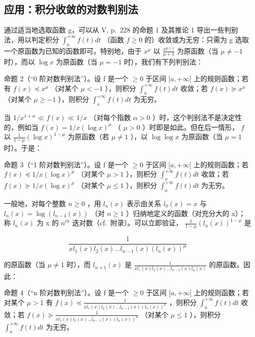\subsection{应用：积分收敛的对数判别法}

通过适当地选取函数 g，可以从 V, p.~228 的命题 1 及其推论 1 导出一些判别法，用以判定积分 \(\int_{a}^{+\infty} f(t) dt\) （函数 \(f \geqslant 0\) 的）收敛或为无穷：只需为 g 选取一个原函数为已知的函数即可。特别地，由于 \(x^{\mu}\) 以 \(\frac{x^{\mu+1}}{\mu+1}\) 为原函数（当 \(\mu \neq -1\) 时），而以 \(\log x\) 为原函数（当 \(\mu = -1\) 时），我们有下列判别法：

命题 2（``0 阶对数判别法''）。设 f 是一个 \(\geqslant 0\) 于区间 \([a, +\infty[\) 上的规则函数；若有 \(f(x) \preccurlyeq x^{\mu}\) （对某个 \(\mu < -1\) ），则积分 \(\int_{a}^{+\infty} f(t) dt\) 收敛；若 \(f(x) \succcurlyeq x^{\mu}\) （对某个 \(\mu \geqslant -1\) ），则积分 \(\int_{a}^{+\infty} f(t) dt\) 为无穷。

当 \(1 / x^{1 + \alpha} \ll f(x) \ll 1 / x\) （对每个指数 \(\alpha > 0\) ）时，这个判别法不是决定性的，例如当 \(f(x) = 1 / x(\log x)^{\mu}\) （ \(\mu > 0\) ）时即是如此。但在后一情形， \(f\) 以 \(\frac{1}{1 - \mu} (\log x)^{1 - \mu}\) 为原函数（若 \(\mu \neq 1\) ），以 \(\log \log x\) 为原函数（当 \(\mu = 1\) 时）。于是：

命题 3（``1 阶对数判别法''）。设 f 是一个 \(\geqslant 0\) 于区间 \([a, +\infty[\) 上的规则函数；若 \(f(x) \preccurlyeq 1/x(\log x)^{\mu}\) （对某个 \(\mu > 1\) ），则积分 \(\int_{a}^{+\infty} f(t) dt\) 收敛；若 \(f(x) \succcurlyeq 1/x(\log x)^{\mu}\) （对某个 \(\mu \leqslant 1\) ），则积分 \(\int_{a}^{+\infty} f(t) dt\) 为无穷。

一般地，对每个整数 \(n \geqslant 0\) ，用 \(l_{n}(x)\) 表示由关系 \(l_{0}(x) = x\) 与 \(l_{n}(x) = \log(l_{n-1}(x))\) （对 \(n \geqslant 1\) ）归纳地定义的函数（对充分大的 x）；称 \(l_{n}(x)\) 为 x 的 \(n^{th}\) 迭对数（cf.~附录）。可以立即验证， \(\frac{1}{1 - \mu}\left(l_{n}(x)\right)^{1 - \mu}\) 是

\[
\frac {1}{x l _ {1} (x) l _ {2} (x) \dots l _ {n - 1} (x) \left(l _ {n} (x)\right) ^ {\mu}}
\]

的原函数（当 \(\mu \neq 1\) 时），而 \(l_{n+1}(x)\) 是 \(\frac{1}{xl_1(x)l_2(x)\ldots l_{n-1}(x)l_n(x)}\) 的原函数。因此：

命题 4（``n 阶对数判别法''）。设 f 是一个 \(\geqslant0\) 于区间 \([a,+\infty[\) 上的规则函数；若对某个 \(\mu>1\) 有 \(f(x)\preccurlyeq\frac{1}{xl_{1}(x)l_{2}(x)\ldots l_{n-1}(x)(l_{n}(x))^{\mu}}\) ，则积分 \(\int_{a}^{+\infty}f(t)dt\) 收敛；若 \(f(x)\succcurlyeq\frac{1}{xl_{1}(x)l_{2}(x)\ldots l_{n-1}(x)(l_{n}(x))^{\mu}}\) （对某个 \(\mu\leqslant1\) ），则积分 \(\int_{a}^{+\infty}f(t)dt\) 为无穷。

